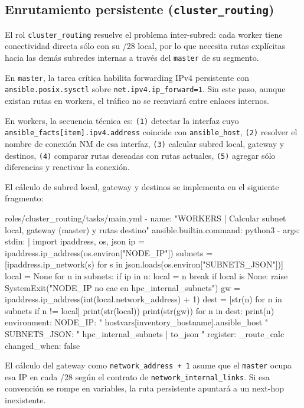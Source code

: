 \subsection{Enrutamiento persistente (\texttt{cluster\_routing})}
El rol \texttt{cluster\_routing} resuelve el problema inter-subred: cada worker tiene conectividad directa sólo con su /28 local, por lo que necesita rutas explícitas hacia las demás subredes internas a través del \texttt{master} de su segmento.

En \texttt{master}, la tarea crítica habilita forwarding IPv4 persistente con \texttt{ansible.posix.sysctl} sobre \texttt{net.ipv4.ip\_forward=1}. Sin este paso, aunque existan rutas en workers, el tráfico no se reenviará entre enlaces internos.

En workers, la secuencia técnica es:
\texttt{(1)} detectar la interfaz cuyo \texttt{ansible\_facts[item].ipv4.address} coincide con \texttt{ansible\_host},
\texttt{(2)} resolver el nombre de conexión NM de esa interfaz,
\texttt{(3)} calcular subred local, gateway y destinos,
\texttt{(4)} comparar rutas deseadas con rutas actuales,
\texttt{(5)} agregar sólo diferencias y reactivar la conexión.

El cálculo de subred local, gateway y destinos se implementa en el siguiente fragmento:

\begin{filecode}{roles/cluster_routing/tasks/main.yml}
- name: "WORKERS | Calcular subnet local, gateway (master) y rutas destino"
  ansible.builtin.command: python3 -
  args:
    stdin: |
      import ipaddress, os, json
      ip = ipaddress.ip_address(os.environ["NODE_IP"])
      subnets = [ipaddress.ip_network(s) for s in json.loads(os.environ["SUBNETS_JSON"])]
      local = None
      for n in subnets:
        if ip in n:
          local = n
          break
      if local is None:
        raise SystemExit("NODE_IP no cae en hpc_internal_subnets")
      gw = ipaddress.ip_address(int(local.network_address) + 1)
      dest = [str(n) for n in subnets if n != local]
      print(str(local))
      print(str(gw))
      for n in dest:
        print(n)
  environment:
    NODE_IP: "{{ hostvars[inventory_hostname].ansible_host }}"
    SUBNETS_JSON: "{{ hpc_internal_subnets | to_json }}"
  register: _route_calc
  changed_when: false
\end{filecode}

El cálculo del gateway como \texttt{network\_address + 1} asume que el \texttt{master} ocupa esa IP en cada /28 según el contrato de \texttt{network\_internal\_links}. Si esa convención se rompe en variables, la ruta persistente apuntará a un next-hop inexistente.

